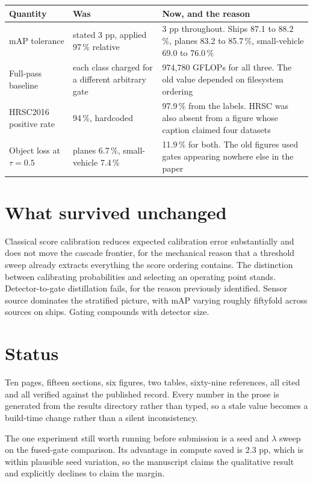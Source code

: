 \documentclass[11pt,a4paper]{article}
\begin{document}
\begin{table}[h]
\centering
\small
\begin{tabular}{p{4.4cm}p{4.0cm}p{5.6cm}}
\toprule
Quantity & Was & Now, and the reason \\
\midrule
mAP tolerance & stated 3 pp, applied 97\,\% relative &
3 pp throughout. Ships 87.1 to 88.2\,\%, planes 83.2 to 85.7\,\%,
small-vehicle 69.0 to 76.0\,\% \\
Full-pass baseline & each class charged for a different arbitrary gate &
974{,}780 GFLOPs for all three. The old value depended on filesystem ordering \\
HRSC2016 positive rate & 94\,\%, hardcoded &
97.9\,\% from the labels. HRSC was also absent from a figure whose caption
claimed four datasets \\
Object loss at $\tau = 0.5$ & planes 6.7\,\%, small-vehicle 7.4\,\% &
11.9\,\% for both. The old figures used gates appearing nowhere else in the
paper \\
\bottomrule
\end{tabular}
\end{table}

\section*{What survived unchanged}

Classical score calibration reduces expected calibration error substantially and
does not move the cascade frontier, for the mechanical reason that a threshold
sweep already extracts everything the score ordering contains. The distinction
between calibrating probabilities and selecting an operating point stands.
Detector-to-gate distillation fails, for the reason previously identified.
Sensor source dominates the stratified picture, with mAP varying roughly
fiftyfold across sources on ships. Gating compounds with detector size.

\section*{Status}

Ten pages, fifteen sections, six figures, two tables, sixty-nine references, all
cited and all verified against the published record. Every number in the prose is
generated from the results directory rather than typed, so a stale value becomes
a build-time change rather than a silent inconsistency.

The one experiment still worth running before submission is a seed and
$\lambda$ sweep on the fused-gate comparison. Its advantage in compute saved is
2.3 pp, which is within plausible seed variation, so the manuscript claims the
qualitative result and explicitly declines to claim the margin.
\end{document}
